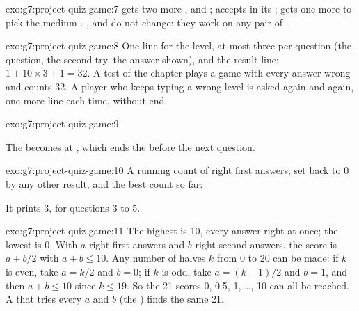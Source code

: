 \begin{solution}{exo:g7:project-quiz-game:7}
 gets two more ,  and
;  accepts  in its
 ;  gets one more  to pick the
medium . ,  and  do not change: they
work on any pair of .
\end{solution}

\begin{solution}{exo:g7:project-quiz-game:8}
One line for the level, at most three per question (the question, the second
try, the answer shown), and the result line: $1 + 10 \times 3 + 1 = 32$. A
test of the chapter plays a game with every answer wrong and counts 32. A
player who keeps typing a wrong level is asked again and again, one more line
each time, without end.
\end{solution}

\begin{solution}{exo:g7:project-quiz-game:9}
\label{lst:g7:project-quiz-game:sol-quit}

The   becomes  at , which ends
the  before the next question.
\end{solution}

\begin{solution}{exo:g7:project-quiz-game:10}
A running count of right first answers, set back to 0 by any other result,
and the best count so far:

\label{lst:g7:project-quiz-game:sol-streak}

It prints 3, for questions 3 to 5.
\end{solution}

\begin{solution}{exo:g7:project-quiz-game:11}
The highest is 10, every answer right at once; the lowest is 0. With $a$ right
first answers and $b$ right second answers, the score is $a + b/2$ with
$a + b \le 10$. Any number of halves $k$ from 0 to 20 can be made: if $k$ is
even, take $a = k/2$ and $b = 0$; if $k$ is odd, take $a = (k-1)/2$ and
$b = 1$, and then $a + b \le 10$ since $k \le 19$. So the 21 scores 0, 0.5,
1, \dots, 10 can all be reached. A  that tries every $a$ and $b$ (the
 ) finds the same 21.
\end{solution}

